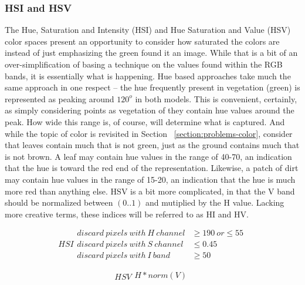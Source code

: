 \documentclass[letterpaper]{article}
\begin{document}
{\subsubsection{HSI and HSV}
The Hue, Saturation and Intensity (HSI) and Hue Saturation and Value (HSV) color spaces present an opportunity to consider how saturated the colors are instead of just emphasizing the green found it an image. While that is a bit of an over-simplification of basing a technique on the values found within the RGB bands, it is essentially what is happening. Hue based approaches take much the same approach in one respect -- the hue frequently present in vegetation (green) is represented as peaking around $120^o$ in both models. This is convenient, certainly, as simply considering points as vegetation of they contain hue values around the peak. How wide this range is, of course, will determine what is captured. And while the topic of color is revisited in Section ~\ref{section:problems-color}, consider that leaves contain much that is not green, just as the ground contains much that is not brown. A leaf may contain hue values in the range of 40-70, an indication that the hue is toward the red end of the representation. Likewise, a patch of dirt may contain hue values in the range of 15-20, an indication that the hue is much more red than anything else. HSV is a bit more complicated, in that the V band should be normalized between $(0..1)$ and mutiplied by the H value. Lacking more creative terms, these indices will be referred to as HI and HV. 

\begin{equation}
	\label{equation:hsi}
	HSI
    \begin{split}
		discard~pixels~with~H~channel &\geq 190~or \leq 55\\
		discard~pixels~with~S~channel &\leq 0.45 \\
		discard~pixels~with~I~band &\geq 50
    \end{split}
\end{equation}

\begin{equation}
	\label{equation:hsv}
	HSV
	\begin{split}
		H * norm(V) \\
	\end{split}
\end{equation}

}
\end{document}
